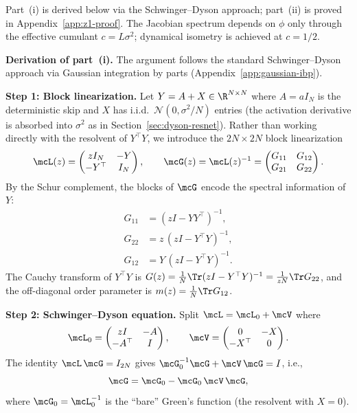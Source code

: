 \noindent Part~(i) is derived below via the Schwinger--Dyson approach; part~(ii) is proved in Appendix~\ref{app:z1-proof}. The Jacobian spectrum depends on $\phi$ only through the effective cumulant $c = L\sigma^2$; dynamical isometry is achieved at $c = 1/2$.

\medskip
\noindent\textbf{Derivation of part~(i).}
The argument follows the standard Schwinger--Dyson approach via Gaussian integration by parts (Appendix~\ref{app:gaussian-ibp}).

\medskip
\noindent\textbf{Step 1: Block linearization.}
Let $Y = A + X \in \R^{N \times N}$ where $A = aI_N$ is the deterministic skip and $X$ has i.i.d.\ $\mathcal{N}(0, \sigma^2/N)$ entries (the activation derivative is absorbed into $\sigma^2$ as in Section~\ref{sec:dyson-resnet}). Rather than working directly with the resolvent of $Y^\top Y$, we introduce the $2N \times 2N$ block linearization
\begin{equation}\label{eq:block-lin}
\mcL(z) = \begin{pmatrix} zI_N & -Y \\ -Y^\top & I_N \end{pmatrix},\qquad
\mcG(z) = \mcL(z)^{-1} = \begin{pmatrix} G_{11} & G_{12} \\ G_{21} & G_{22} \end{pmatrix}.
\end{equation}
By the Schur complement, the blocks of $\mcG$ encode the spectral information of $Y$:
\begin{align}
G_{11} &= (zI - YY^\top)^{-1}, \label{eq:G11}\\
G_{22} &= z\,(zI - Y^\top Y)^{-1}, \label{eq:G22}\\
G_{12} &= Y\,(zI - Y^\top Y)^{-1}. \label{eq:G12}
\end{align}
The Cauchy transform of $Y^\top Y$ is $G(z) = \frac{1}{N}\Tr(zI - Y^\top Y)^{-1} = \frac{1}{zN}\Tr G_{22}$, and the off-diagonal order parameter is $m(z) = \frac{1}{N}\Tr G_{12}$.

\medskip
\noindent\textbf{Step 2: Schwinger--Dyson equation.}
Split $\mcL = \mcL_0 + \mcV$ where
\[
\mcL_0 = \begin{pmatrix} zI & -A \\ -A^\top & I \end{pmatrix}, \qquad
\mcV = \begin{pmatrix} 0 & -X \\ -X^\top & 0 \end{pmatrix}.
\]
The identity $\mcL\,\mcG = I_{2N}$ gives $\mcG_0^{-1}\mcG + \mcV\,\mcG = I$, i.e.,
\begin{equation}\label{eq:sd-identity}
\mcG = \mcG_0 - \mcG_0 \,\mcV\, \mcG,
\end{equation}
where $\mcG_0 = \mcL_0^{-1}$ is the ``bare'' Green's function (the resolvent with $X = 0$).

